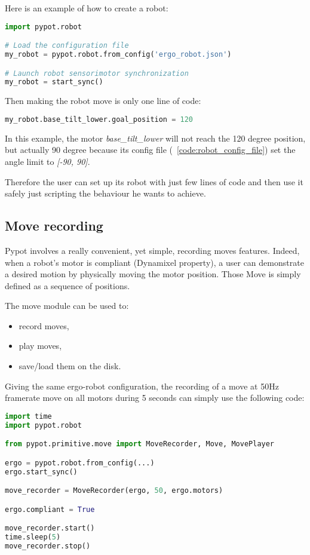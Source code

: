 Here is an example of how to create a robot:
\begin{lstlisting}[language = Python]
import pypot.robot

# Load the configuration file
my_robot = pypot.robot.from_config('ergo_robot.json')

# Launch robot sensorimotor synchronization
my_robot = start_sync()
\end{lstlisting}


Then making the robot move is only one line of code:
\begin{lstlisting}[language = Python]
my_robot.base_tilt_lower.goal_position = 120
\end{lstlisting}

In this example, the motor \emph{base\_tilt\_lower} will not reach the 120 degree position, but actually 90 degree because its config file (\codename~\ref{code:robot_config_file}) set the angle limit to \emph{[-90, 90]}.

Therefore the user can set up its robot with just few lines of code and then use it safely just scripting the behaviour he wants to achieve.


\subsection{Move recording} %
\label{sub:move_recording}

Pypot involves a really convenient, yet simple, recording moves features. Indeed, when a robot's motor is compliant (Dynamixel property), a user can demonstrate a desired motion by physically moving the motor position. Those Move is simply defined as a sequence of positions.

The move module can be used to:

\begin{itemize}
    \item record moves,
    \item play moves,
    \item save/load them on the disk.
\end{itemize}

Giving the same ergo-robot configuration, the recording of a move at 50Hz framerate move on all motors during 5 seconds can simply use the following code:

\begin{lstlisting}[language = Python]
import time
import pypot.robot

from pypot.primitive.move import MoveRecorder, Move, MovePlayer

ergo = pypot.robot.from_config(...)
ergo.start_sync()

move_recorder = MoveRecorder(ergo, 50, ergo.motors)

ergo.compliant = True

move_recorder.start()
time.sleep(5)
move_recorder.stop()
\end{lstlisting}

